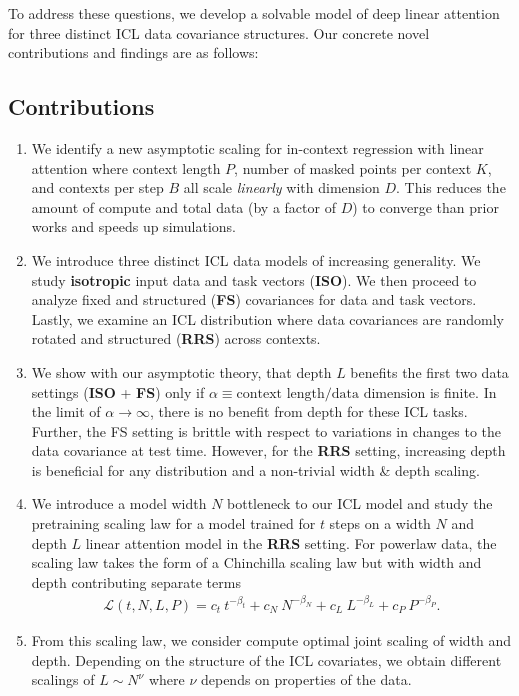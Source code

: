\documentclass{article} %
\begin{document}
To address these questions, we develop a solvable model of deep linear attention for three distinct ICL data covariance structures. Our concrete novel contributions and findings are as follows:
\vspace{-12pt}
\subsection{Contributions}
\begin{enumerate}
    \item We identify a new asymptotic scaling for in-context regression with linear attention where context length $P$, number of masked points per context $K$, and contexts per step $B$ all scale \textit{linearly} with dimension $D$. This reduces the amount of compute and total data (by a factor of $D$) to converge than prior works \citep{lu2025asymptotictheoryincontextlearning} and speeds up simulations. 
    \item We introduce three distinct ICL data models of increasing generality. We study \textbf{isotropic} input data and task vectors (\textbf{ISO}). We then proceed to analyze fixed and structured (\textbf{FS}) covariances for data and task vectors. Lastly, we examine an ICL distribution where data covariances are randomly rotated and structured (\textbf{RRS}) across contexts. 
    \item We show with our asymptotic theory, that depth $L$ benefits the first two data settings (\textbf{ISO} + \textbf{FS}) only if $\alpha\equiv \text{context length}/\text{data dimension} $ is finite. In the limit of $\alpha \to \infty$, there is no benefit from depth for these ICL tasks. Further, the FS setting is brittle with respect to variations in changes to the data covariance at test time. However, for the \textbf{RRS} setting, increasing depth is beneficial for any distribution and a non-trivial width \& depth scaling.
    \item We introduce a model width $N$ bottleneck to our ICL model and study the pretraining scaling law for a model trained for $t$ steps on a width $N$ and depth $L$ linear attention model in the \textbf{RRS} setting. For powerlaw data, the scaling law takes the form of a Chinchilla scaling law but with width and depth contributing separate terms
    \begin{align}
        \mathcal L(t,N,L,P) = c_t \  t^{-\beta_t} + c_N \  N^{-\beta_N} + c_L \  L^{-\beta_L} +c_P \  P^{-\beta_P} .
    \end{align}
    \item From this scaling law, we consider compute optimal joint scaling of width and depth. Depending on the structure of the ICL covariates, we obtain different scalings of $L \sim N^{ \nu }$ where $\nu$ depends on properties of the data. 
\end{enumerate}
\end{document}
